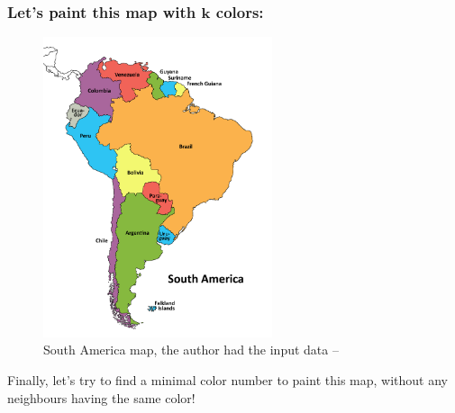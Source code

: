 \documentclass{beamer}
\begin{document}
\begin{frame}[fragile] 

\frametitle{Let's paint this map with \(\textbf{k}\) colors:}
	
\begin{figure}[tbp]
  \centering
    \includegraphics[width=0.6\textwidth , height=0.65\textheight] {south_america.png}
   \caption{South America map, the author had the input data --  \Smiley{}}
	
\end{figure}
	
\pause
Finally, let's try to  find a minimal color number to paint this map, without any neighbours having the same color!

\end{frame}


\end{document}
